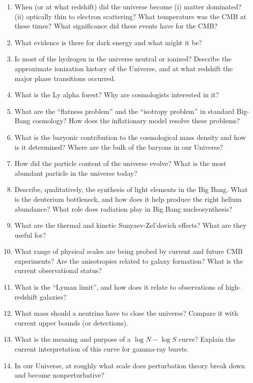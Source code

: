 \documentclass[11pt, oneside]{book}
\begin{document}
\begin{enumerate}[start=126, itemsep=0.4cm]
    \item When (or at what redshift) did the universe become (i) matter dominated? (ii) optically thin to electron scattering? What temperature was the CMB at these times? What significance did these events have for the CMB?
    \item What evidence is there for dark energy and what might it be?
    \item Is most of the hydrogen in the universe neutral or ionized? Describe the approximate ionization history of the Universe, and at what redshift the major phase transitions occurred.
    \item What is the Ly alpha forest? Why are cosmologists interested in it?
    \item What are the ``flatness problem'' and the ``isotropy problem'' in standard Big-Bang cosmology? How does the inflationary model resolve these problems?
    \item What is the baryonic contribution to the cosmological mass density and how is it determined? Where are the bulk of the baryons in our Universe?
    \item How did the particle content of the universe evolve? What is the most abundant particle in the universe today?
    \item Describe, qualitatively, the synthesis of light elements in the Big Bang. What is the deuterium bottleneck, and how does it help produce the right helium abundance? What role does radiation play in Big Bang nucleosynthesis?
    \item What are the thermal and kinetic Sunyaev-Zel'dovich effects? What are they useful for?
    \item What range of physical scales are being probed by current and future CMB experiments? Are the anisotropies related to galaxy formation? What is the current observational status?
    \item What is the ``Lyman limit'', and how does it relate to observations of high-redshift galaxies?
    \item What mass should a neutrino have to close the universe? Compare it with current upper bounds (or detections).
    \item What is the meaning and purpose of a $\log N - \log S$ curve? Explain the current interpretation of this curve for gamma-ray bursts.
    \item In our Universe, at roughly what scale does perturbation theory break down and become nonperturbative?
\end{enumerate}
\end{document}
